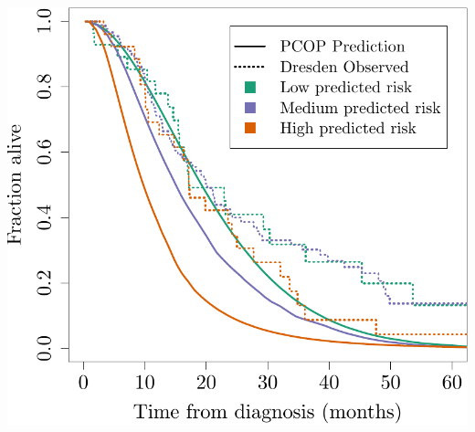 \documentclass{article}\usepackage[]{graphicx}\usepackage[]{color}
\makeatletter
\def\maxwidth{ %
  \ifdim\Gin@nat@width>\linewidth
    \linewidth
  \else
    \Gin@nat@width
  \fi
}
\newenvironment{knitrout}{}{} %
\makeatother
\begin{document}
\begin{knitrout}
{\centering \includegraphics[width=\maxwidth]{figure/07-altman-4-dresden-2} 

}



\end{knitrout}
\end{document}
